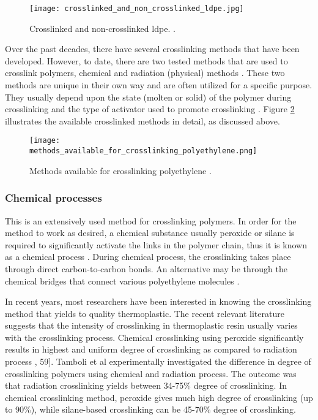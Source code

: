 \begin{figure}[H]
    \centering
    \texttt{[image: crosslinked\_and\_non\_crosslinked\_ldpe.jpg]}
    \caption{Crosslinked and non-crosslinked \acrshort{ldpe}. \cite{kurtz2009cross}.}
    \label{ch3:figure:ldpe}
\end{figure}

Over the past decades, there have several crosslinking methods that have been developed. However, to date, there are two tested methods that are used to crosslink polymers, chemical and radiation (physical) methods \cite{clemens2017microstructure, bajaj2020steels}. These two methods are unique in their own way and are often utilized for a specific purpose. They usually depend upon the state (molten or solid) of the polymer during crosslinking and the type of activator used to promote crosslinking \cite{kurtz2009cross}. Figure \ref{ch3:figure:crosslinking_methods} illustrates the available crosslinked methods in detail, as discussed above.

\begin{figure}[H]
    \centering
    \texttt{[image: methods\_available\_for\_crosslinking\_polyethylene.png]}
    \caption{Methods available for crosslinking polyethylene \cite{patterson2022cross}.}
    \label{ch3:figure:crosslinking_methods}
\end{figure}

\subsubsection{Chemical processes}
This is an extensively used method for crosslinking polymers. In order for the method to work as desired, a chemical substance usually peroxide or silane is required to significantly activate the links in the polymer chain, thus it is known as a chemical process \cite{meola2005cross}. During chemical process, the crosslinking takes place through direct carbon-to-carbon bonds. An alternative may be through the chemical bridges that connect various polyethylene molecules \cite{kurtz2009cross}.  

In recent years, most researchers have been interested in knowing the crosslinking method that yields to quality thermoplastic. The recent relevant literature suggests that the intensity of crosslinking in thermoplastic resin usually varies with the crosslinking process. Chemical crosslinking using peroxide significantly results in highest and uniform degree of crosslinking as compared to radiation process \cite{clemens2017microstructure}, 59]. Tamboli et al \cite{meola2005cross} experimentally investigated the difference in degree of crosslinking polymers using chemical and radiation process. The outcome was that radiation crosslinking yields between 34-75\% degree of crosslinking. In chemical crosslinking method, peroxide gives much high degree of crosslinking (up to 90\%), while silane-based crosslinking can be 45-70\% degree of crosslinking.

